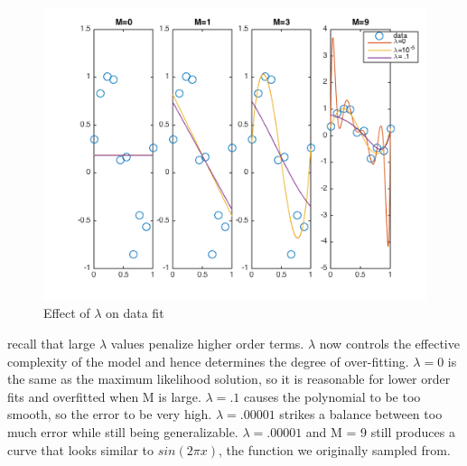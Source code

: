 \documentclass[10pt,twocolumn]{article}
\begin{document}
\begin{figure}[H]
\center
\includegraphics[scale =.5]{rr_lambdas.png}
\caption{Effect of $\lambda$ on data fit}
\end{figure}

recall that large $\lambda$ values penalize higher order terms. $\lambda$ now controls the effective complexity
of the model and hence determines the degree of over-fitting.  $\lambda = 0$ is the same as the maximum likelihood solution, so it is reasonable for lower order fits and overfitted when M is large. $\lambda = .1$ causes the polynomial to be too smooth, so the error to be very high. $\lambda = .00001$ strikes a balance between too much error while still being generalizable. $\lambda = .00001$ and M = 9 still produces a curve that looks similar to $sin(2\pi x)$, the function we originally sampled from.
\end{document}

